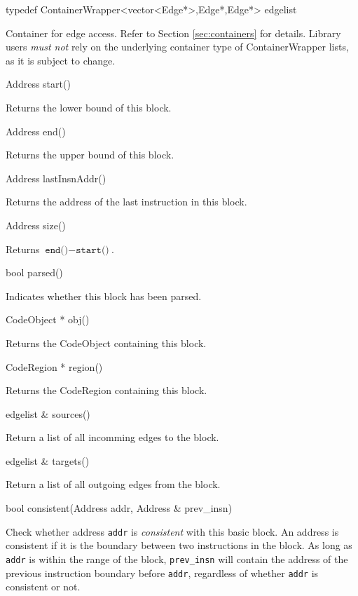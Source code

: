 \documentclass{article}
\newenvironment{apient}{\small\verbatim}{\endverbatim}
\newcommand{\apidesc}[1]{%
{\addtolength{\leftskip}{4em}%
#1\par\medskip}
}
\begin{document}
\begin{apient}
typedef ContainerWrapper<vector<Edge*>,Edge*,Edge*> edgelist
\end{apient}
\apidesc{Container for edge access. Refer to Section \ref{sec:containers} for details. Library users \emph{must not} rely on the underlying container type of ContainerWrapper lists, as it is subject to change.}


\begin{apient}
Address start()
\end{apient}
\apidesc{Returns the lower bound of this block.}

\begin{apient}
Address end()
\end{apient}
\apidesc{Returns the upper bound of this block.}

\begin{apient}
Address lastInsnAddr()
\end{apient}
\apidesc{Returns the address of the last instruction in this block.}

\begin{apient}
Address size()
\end{apient}
\apidesc{Returns $\texttt{end()} - \texttt{start()}$.}

\begin{apient}
bool parsed()
\end{apient}
\apidesc{Indicates whether this block has been parsed.}

\begin{apient}
CodeObject * obj()
\end{apient}
\apidesc{Returns the CodeObject containing this block.}

\begin{apient}
CodeRegion * region()
\end{apient}
\apidesc{Returns the CodeRegion containing this block.}

\begin{apient}
edgelist & sources()
\end{apient}
\apidesc{Return a list of all incomming edges to the block.}

\begin{apient}
edgelist & targets()
\end{apient}
\apidesc{Return a list of all outgoing edges from the block.}

\begin{apient}
bool consistent(Address addr, Address & prev_insn)
\end{apient}
\apidesc{Check whether address \texttt{addr} is \emph{consistent} with this basic block. An address is consistent if it is the boundary between two instructions in the block. As long as \texttt{addr} is within the range of the block, \texttt{prev\_insn} will contain the address of the previous instruction boundary before \texttt{addr}, regardless of whether \texttt{addr} is consistent or not.}
\end{document}
